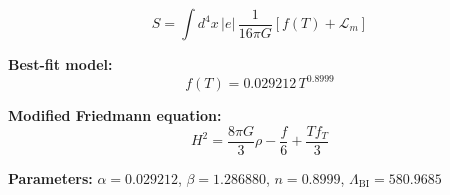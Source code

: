 
\begin{equation}
  S = \int d^4x \, |e| \, \frac{1}{16\pi G} \left[ f(T) + \mathcal{L}_m \right]
\end{equation}

\textbf{Best-fit model:}
\begin{equation}
  f(T) = 0.029212 \, T^{0.8999}
\end{equation}

\textbf{Modified Friedmann equation:}
\begin{equation}
  H^2 = \frac{8\pi G}{3} \rho - \frac{f}{6} + \frac{T f_T}{3}
\end{equation}

\textbf{Parameters:}
$\alpha = 0.029212$, \quad
$\beta = 1.286880$, \quad
$n = 0.8999$, \quad
$\Lambda_{\text{BI}} = 580.9685$